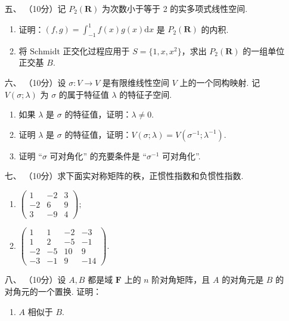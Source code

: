 \begin{enumerate}
\item [五、]（10分）记 $P_2(\mathbf{R})$ 为次数小于等于 2 的实多项式线性空间.
\begin{enumerate}[label=(\arabic*)]
    \item 证明：$(f,g)=\int_{-1}^1f(x)g(x)\mathrm{d}x$ 是 $P_2(\mathbf{R})$ 的内积.

    \item 将 $\mathrm{Schmidt}$ 正交化过程应用于 $S=\{1,x,x^2\}$，求出 $P_2(\mathbf{R})$ 的一组单位正交基 $B$.
\end{enumerate}

\item [六、]（10分）设 $\sigma:V\to V$ 是有限维线性空间 $V$ 上的一个同构映射. 记 $V(\sigma;\lambda)$ 为 $\sigma$ 的属于特征值 $\lambda$ 的特征子空间.
    \begin{enumerate}[label=(\arabic*)]
        \item 如果 $\lambda$ 是 $\sigma$ 的特征值，证明：$\lambda \neq 0$.

        \item 证明 $\lambda$ 是 $\sigma$ 的特征值，证明：$V(\sigma;\lambda)=V(\sigma^{-1};\lambda^{-1})$.

        \item 证明 ``$\sigma$ 可对角化'' 的充要条件是 ``$\sigma^{-1}$ 可对角化''.
    \end{enumerate}

\item [七、]（10分）求下面实对称矩阵的秩，正惯性指数和负惯性指数.
    \begin{enumerate}[label=(\arabic*)]
        \item $\begin{pmatrix}1 & -2 & 3 \\ -2 & 6 & 9 \\ 3 & -9 & 4\end{pmatrix};$

        \item $\begin{pmatrix}1 & 1 & -2 & -3\\ 1 & 2 & -5 & -1 \\ -2 & -5 & 10 & 9 \\ -3 & -1 & 9 & -14\end{pmatrix}$.
    \end{enumerate}

\item [八、]（10分）设 $A,B$ 都是域 $\mathbf{F}$ 上的 $n$ 阶对角矩阵，且 $A$ 的对角元是 $B$ 的对角元的一个置换. 证明：
    \begin{enumerate}[label=(\arabic*)]
        \item $A$ 相似于 $B$.


\end{enumerate}
\end{enumerate}
